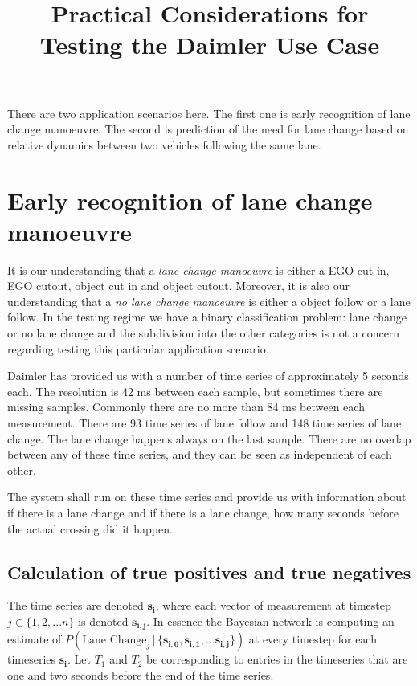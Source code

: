 \documentclass{article}
\title{Practical Considerations for Testing the Daimler Use Case}
\date{}
\theoremstyle{theorem}
\theoremstyle{definition}
\newcommand{\bu}[1]{\mathbf{#1}}
\newcommand{\bv}[1]{\bm{#1}}
\begin{document}
\maketitle

There are two application scenarios here.  The first one is early recognition of lane change manoeuvre. The second is prediction of the need for lane change based on relative dynamics between two vehicles following the same lane.

\section{Early recognition of lane change manoeuvre}

It is our understanding that a \emph{lane change manoeuvre} is either a EGO cut in, EGO cutout, object cut in and object cutout.  Moreover, it is also our understanding that a \emph{no lane change manoeuvre} is either a object follow or a lane follow.  In the testing regime we have a binary classification problem: lane change or no lane change and the subdivision  into the other categories is not a concern regarding testing this particular application scenario.

Daimler has provided us with a number of time series of approximately 5 seconds each.  The resolution is 42 ms between each sample, but sometimes there are missing samples.  Commonly there are no more than 84 ms between each measurement.  There are 93 time series of lane follow and 148 time series of lane change.  The lane change happens always on the last sample. There are no overlap between any of these time series, and they can be seen as independent of each other.

The system shall run on these time series and provide us with information about if there is a lane change and if there is a lane change, how many seconds before the actual crossing did it happen.

\subsection*{Calculation of true positives and true negatives}

The time series are denoted $\bu{s_i}$, where each vector of measurement at timestep $j \in \{1,2, ... n\}$ is denoted $\bv{s_{i,j}}$. In essence the Bayesian network is computing an estimate of $P(\mbox{Lane Change}_j \,|\, \{ \bv{s_{i,0}}, \bv{s_{i,1}}, ... \bv{s_{i,j}} \})$ at every timestep for each timeseries $\bu{s_i}$.  Let $T_1$ and $T_2$ be corresponding to entries in the timeseries that are one and two seconds before the end of the time series.   
\end{document}
